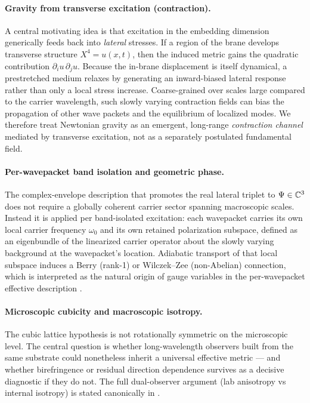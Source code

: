 \paragraph{Gravity from transverse excitation (contraction).}
A central motivating idea is that excitation in the embedding dimension generically feeds back into
\emph{lateral} stresses.
If a region of the brane develops transverse structure $X^4=u(x,t)$, then the induced metric gains the quadratic
contribution $\partial_i u\,\partial_j u$.
Because the in-brane displacement is itself dynamical, a prestretched medium relaxes by generating an inward-biased
lateral response rather than only a local stress increase.
Coarse-grained over scales large compared to the carrier wavelength, such slowly varying contraction fields can bias the
propagation of other wave packets and the equilibrium of localized modes.
We therefore treat Newtonian gravity as an emergent, long-range \emph{contraction channel} mediated by transverse
excitation, not as a separately postulated fundamental field.

\paragraph{Per-wavepacket band isolation and geometric phase.}
The complex-envelope description that promotes the real lateral triplet to $\Psi\in\mathbb{C}^3$ does not require a
globally coherent carrier sector spanning macroscopic scales.
Instead it is applied per band-isolated excitation: each wavepacket carries its own local carrier frequency
$\omega_0$ and its own retained polarization subspace, defined as an eigenbundle of the linearized carrier
operator about the slowly varying background at the wavepacket's location.
Adiabatic transport of that local subspace induces a Berry (rank-1) or Wilczek--Zee (non-Abelian) connection,
which is interpreted as the natural origin of gauge variables in the per-wavepacket effective description
\citep{Pancharatnam1956,Berry1984,WilczekZee1984,Bliokh2015SpinOrbit,Cisowski2022}.

\paragraph{Microscopic cubicity and macroscopic isotropy.}
The cubic lattice hypothesis is not rotationally symmetric on the microscopic level.
The central question is whether long-wavelength observers built from the same substrate could nonetheless inherit a
universal effective metric --- and whether birefringence or residual direction dependence survives as a decisive diagnostic
if they do not.
The full dual-observer argument (lab anisotropy vs internal isotropy) is stated canonically in .

